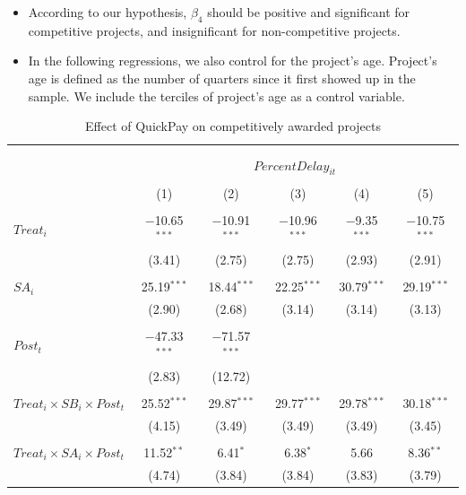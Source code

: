 \documentclass[
]{article}
\begin{document}
\begin{itemize}
\item
  According to our hypothesis, \(\beta_4\) should be positive and
  significant for competitive projects, and insignificant for
  non-competitive projects.
\item
  In the following regressions, we also control for the project's age.
  Project's age is defined as the number of quarters since it first
  showed up in the sample. We include the terciles of project's age as a
  control variable.
\end{itemize}

\begin{table}[H] \centering 
  \caption{Effect of QuickPay on competitively awarded projects} 
  \label{} 
\small 
\begin{tabular}{@{\extracolsep{-2pt}}lccccc} 
\\[-1.8ex]\hline 
\hline \\[-1.8ex] 
\\[-1.8ex] & \multicolumn{5}{c}{$PercentDelay_{it}$  } \\ 
\\[-1.8ex] & (1) & (2) & (3) & (4) & (5)\\ 
\hline \\[-1.8ex] 
 $Treat_i$ & $-$10.65$^{***}$ & $-$10.91$^{***}$ & $-$10.96$^{***}$ & $-$9.35$^{***}$ & $-$10.75$^{***}$ \\ 
  & (3.41) & (2.75) & (2.75) & (2.93) & (2.91) \\ 
  & & & & & \\ 
 $SA_i$ & 25.19$^{***}$ & 18.44$^{***}$ & 22.25$^{***}$ & 30.79$^{***}$ & 29.19$^{***}$ \\ 
  & (2.90) & (2.68) & (3.14) & (3.14) & (3.13) \\ 
  & & & & & \\ 
 $Post_t$ & $-$47.33$^{***}$ & $-$71.57$^{***}$ &  &  &  \\ 
  & (2.83) & (12.72) &  &  &  \\ 
  & & & & & \\ 
 $Treat_i \times SB_i \times Post_t$ & 25.52$^{***}$ & 29.87$^{***}$ & 29.77$^{***}$ & 29.78$^{***}$ & 30.18$^{***}$ \\ 
  & (4.15) & (3.49) & (3.49) & (3.49) & (3.45) \\ 
  & & & & & \\ 
 $Treat_i \times SA_i \times Post_t$ & 11.52$^{**}$ & 6.41$^{*}$ & 6.38$^{*}$ & 5.66 & 8.36$^{**}$ \\ 
  & (4.74) & (3.84) & (3.84) & (3.83) & (3.79) \\ 

\end{tabular}
\end{table}
\end{document}

